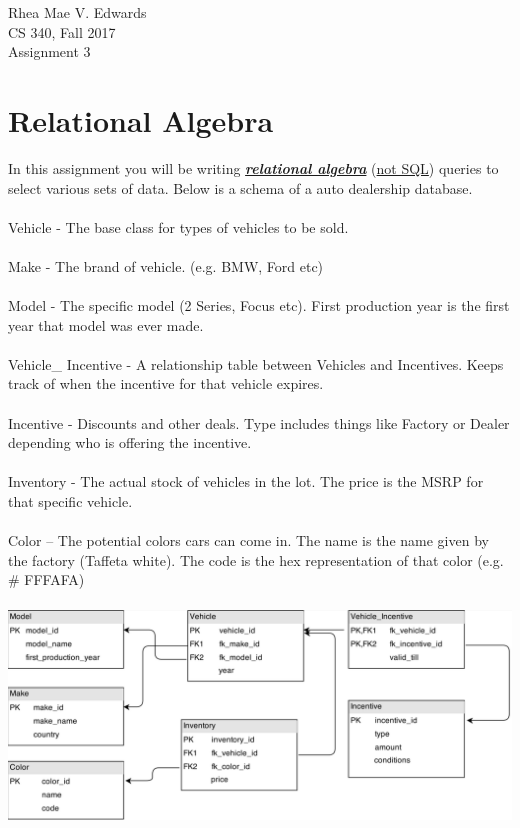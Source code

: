 \documentclass[letterpaper,10pt,onecolumn,fleqn]{IEEEtran}
\begin{document}
\noindent
Rhea Mae V. Edwards\\
CS 340, Fall 2017\\
Assignment 3

\section*{Relational Algebra}

\noindent
In this assignment you will be writing \underline{\textbf{\textit{relational algebra}}} (\underline{not SQL}) queries to select various sets of
data. Below is a schema of a auto dealership database.
\\ ~ \\ \noindent
Vehicle - The base class for types of vehicles to be sold.
\\ ~ \\ \noindent
Make - The brand of vehicle. (e.g. BMW, Ford etc)
\\ ~ \\ \noindent
Model - The specific model (2 Series, Focus etc). First production year is the first year that model was ever made.
\\ ~ \\ \noindent
Vehicle\_ Incentive - A relationship table between Vehicles and Incentives. Keeps track of when the incentive for that vehicle expires.
\\ ~ \\ \noindent
Incentive - Discounts and other deals. Type includes things like Factory or Dealer depending who is offering the incentive.
\\ ~ \\ \noindent
Inventory - The actual stock of vehicles in the lot. The price is the MSRP for that specific vehicle.
\\ ~ \\ \noindent
Color – The potential colors cars can come in. The name is the name given by the factory (Taffeta white).
The code is the hex representation of that color (e.g. \# FFFAFA)
\\ ~ \\

\includegraphics[width=\linewidth]{schema.png}
\end{document}
